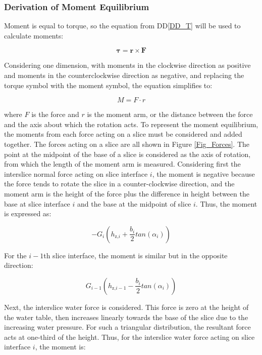 \documentclass[12pt]{article}
\newcommand{\ddref}[1]{DD\ref{#1}}
\begin{document}
\subsubsection*{Derivation of Moment Equilibrium}
\noindent
Moment is equal to torque, so the equation from \ddref{DD_T} will be used to 
calculate moments:

\begin{equation*}
\boldsymbol{\tau} = \mathbf{r} \times \mathbf{F}
\end{equation*}

\noindent Considering one dimension, with moments in the clockwise direction as 
positive and moments in the counterclockwise direction as negative, and 
replacing the torque symbol with the moment symbol, the equation simplifies to:

\begin{equation*}
M = F \cdot r
\end{equation*}

\noindent where $F$ is the force and $r$ is the moment arm, or the distance 
between the force and the axis about which the rotation acts. To represent the 
moment equilibrium, the moments from each force 
acting on a slice must be considered and added together. The forces acting on a 
slice are all shown in Figure \ref{Fig_Forces}. The point at the midpoint of
the base of a slice is considered as the axis of rotation, from which the 
length of the moment arm is measured. Considering first the interslice normal 
force acting on slice interface $i$, the moment is negative because the force 
tends to rotate the slice in a counter-clockwise direction, and the moment arm 
is the 
height of the force plus the difference in height between the base at slice 
interface $i$ and the base at the midpoint of slice $i$. Thus, the moment is 
expressed as:

\begin{equation*}
- G_{i} (h_{\text{z,}i} + \frac{b_{i}}{2}tan(\alpha_{i}))
\end{equation*}

\noindent For the $i-1$th slice interface, the moment is similar but in the
opposite direction:

\begin{equation*}
G_{i-1} (h_{\text{z,}i-1} - \frac{b_{i}}{2}tan(\alpha_{i}))
\end{equation*}

\noindent Next, the interslice water force is considered. This force is zero at 
the height of the water table, then increases linearly towards the base of the 
slice due to the increasing water pressure. For such a triangular distribution, 
the resultant force acts at one-third of the height. Thus, for the interslice 
water force acting on slice interface $i$, the moment is:
\end{document}
